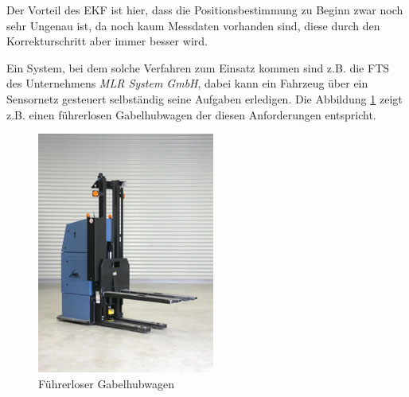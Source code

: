 Der Vorteil des \ac{EKF} ist hier, dass die Positionsbestimmung zu
Beginn zwar noch sehr Ungenau ist, da noch kaum Messdaten vorhanden
sind, diese durch den Korrekturschritt aber immer besser wird.
\cite{roehrig2009} 

Ein System, bei dem solche Verfahren zum Einsatz kommen sind z.B. die
\ac{FTS} des Unternehmens \textit{MLR System GmbH}, dabei kann ein
Fahrzeug über ein Sensornetz gesteuert selbständig seine Aufgaben
erledigen. Die Abbildung \ref{fig:fg} zeigt z.B. einen führerlosen
Gabelhubwagen der diesen Anforderungen entspricht.

\begin{figure}[h!]
  \centering
  \includegraphics[scale=1.0]{img/Fahr_Gabelhubwagen}

  \caption{Führerloser Gabelhubwagen}
  \label{fig:fg}
\end{figure}
